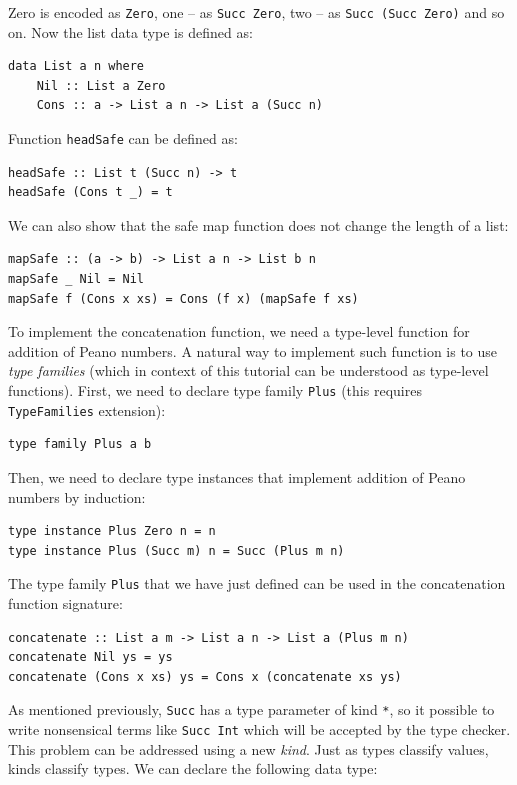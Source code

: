 \documentclass{tmr}
\newcommand{\italic}[1]{\textit{#1}}
\begin{document}
Zero is encoded as \verb|Zero|, one -- as \verb|Succ Zero|, two -- as \verb|Succ (Succ Zero)| and so on. Now the list data type is defined as:

\begin{Verbatim}
data List a n where
    Nil :: List a Zero
    Cons :: a -> List a n -> List a (Succ n)
\end{Verbatim}

Function \verb|headSafe| can be defined as:

\begin{Verbatim}
headSafe :: List t (Succ n) -> t
headSafe (Cons t _) = t 
\end{Verbatim}

We can also show that the safe map function does not change the length of a list:

\begin{Verbatim}
mapSafe :: (a -> b) -> List a n -> List b n
mapSafe _ Nil = Nil
mapSafe f (Cons x xs) = Cons (f x) (mapSafe f xs) 
\end{Verbatim}

To implement the concatenation function, we need a type-level function for addition of Peano numbers. A natural way to implement such function is to use \italic{type families} (which in context of this tutorial can be understood as type-level functions). First, we need to declare type family \verb|Plus| (this requires \verb|TypeFamilies| extension):

\begin{Verbatim}
type family Plus a b
\end{Verbatim}

Then, we need to declare type instances that implement addition of Peano numbers by induction:

\begin{Verbatim}
type instance Plus Zero n = n
type instance Plus (Succ m) n = Succ (Plus m n)
\end{Verbatim}

The type family \verb|Plus| that we have just defined can be used in the concatenation function signature:

\begin{Verbatim}
concatenate :: List a m -> List a n -> List a (Plus m n)
concatenate Nil ys = ys
concatenate (Cons x xs) ys = Cons x (concatenate xs ys)
\end{Verbatim}

As mentioned previously, \verb|Succ| has a type parameter of kind \verb|*|, so it possible to write nonsensical terms like \verb|Succ Int| which will be accepted by the type checker. This problem can be addressed using a new \italic{kind}. Just as types classify values, kinds classify types. We can declare the following data type:
\end{document}
